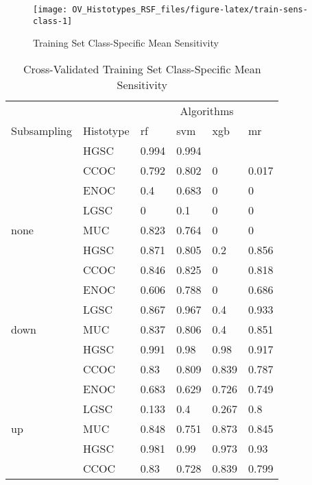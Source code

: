 \documentclass[
]{report}
\begin{document}
\begin{figure}[H]

{\centering \texttt{[image: OV\_Histotypes\_RSF\_files/figure-latex/train-sens-class-1]} 

}

\caption{Training Set Class-Specific Mean Sensitivity}\label{fig:train-sens-class}
\end{figure}

\begin{table}

\caption{\label{tab:train-sens-class-table}Cross-Validated Training Set Class-Specific Mean Sensitivity}
\centering
\begin{tabular}[t]{l|l|l|l|l|l}
\hline
\multicolumn{2}{c|}{ } & \multicolumn{4}{c}{Algorithms} \\
\cline{3-6}
Subsampling & Histotype & rf & svm & xgb & mr\\
\hline
 & HGSC & 0.994 & 0.994 & \cellcolor[HTML]{90ee90}{1} & \cellcolor[HTML]{90ee90}{1}\\
\cline{2-6}
 & CCOC & 0.792 & 0.802 & 0 & 0.017\\
\cline{2-6}
 & ENOC & 0.4 & 0.683 & 0 & 0\\
\cline{2-6}
 & LGSC & 0 & 0.1 & 0 & 0\\
\cline{2-6}
\multirow{-5}{*}{\raggedright\arraybackslash none} & MUC & 0.823 & 0.764 & 0 & 0\\
\cline{1-6}
 & HGSC & 0.871 & 0.805 & 0.2 & 0.856\\
\cline{2-6}
 & CCOC & 0.846 & 0.825 & 0 & 0.818\\
\cline{2-6}
 & ENOC & 0.606 & 0.788 & 0 & 0.686\\
\cline{2-6}
 & LGSC & 0.867 & 0.967 & 0.4 & 0.933\\
\cline{2-6}
\multirow{-5}{*}{\raggedright\arraybackslash down} & MUC & 0.837 & 0.806 & 0.4 & 0.851\\
\cline{1-6}
 & HGSC & 0.991 & 0.98 & 0.98 & 0.917\\
\cline{2-6}
 & CCOC & 0.83 & 0.809 & 0.839 & 0.787\\
\cline{2-6}
 & ENOC & 0.683 & 0.629 & 0.726 & 0.749\\
\cline{2-6}
 & LGSC & 0.133 & 0.4 & 0.267 & 0.8\\
\cline{2-6}
\multirow{-5}{*}{\raggedright\arraybackslash up} & MUC & 0.848 & 0.751 & 0.873 & 0.845\\
\cline{1-6}
 & HGSC & 0.981 & 0.99 & 0.973 & 0.93\\
\cline{2-6}
 & CCOC & 0.83 & 0.728 & 0.839 & 0.799\\

\end{tabular}
\end{table}
\end{document}

